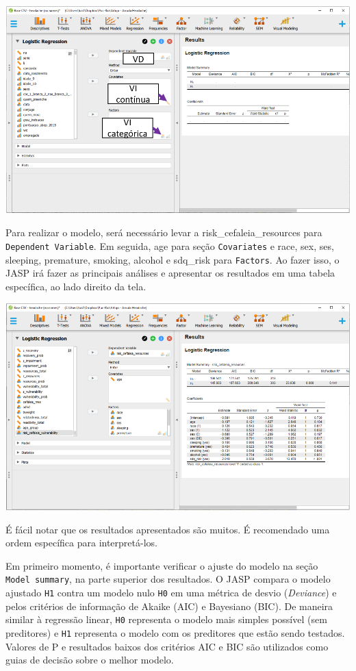 \documentclass[
]{book}
\begin{document}
\includegraphics{./img/cap_logistica_interface.png}

Para realizar o modelo, será necessário levar a
risk\_cefaleia\_resources para \texttt{Dependent\ Variable}. Em seguida,
age para seção \texttt{Covariates} e race, sex, ses, sleeping,
premature, smoking, alcohol e sdq\_risk para \texttt{Factors}. Ao fazer
isso, o JASP irá fazer as principais análises e apresentar os resultados
em uma tabela específica, ao lado direito da tela.

\includegraphics{./img/cap_logistica_resultado_0.png}

É fácil notar que os resultados apresentados são muitos. É recomendado
uma ordem específica para interpretá-los.

Em primeiro momento, é importante verificar o ajuste do modelo na seção
\texttt{Model\ summary}, na parte superior dos resultados. O JASP
compara o modelo ajustado \texttt{H1} contra um modelo nulo \texttt{H0}
em uma métrica de desvio (\emph{Deviance}) e pelos critérios de
informação de Akaike (AIC) e Bayesiano (BIC). De maneira similar à
regressão linear, \texttt{H0} representa o modelo mais simples possível
(sem preditores) e \texttt{H1} representa o modelo com os preditores que
estão sendo testados. Valores de P e resultados baixos dos critérios AIC
e BIC são utilizados como guias de decisão sobre o melhor modelo.
\end{document}
